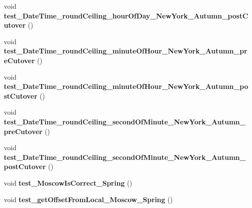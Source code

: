 \begin{DoxyCompactItemize}
\item 
\hypertarget{classorg_1_1joda_1_1time_1_1_test_date_time_zone_cutover_ac9579475951bc638caa91ef9fdf9e3fb}{void {\bfseries test\-\_\-\-Date\-Time\-\_\-round\-Ceiling\-\_\-hour\-Of\-Day\-\_\-\-New\-York\-\_\-\-Autumn\-\_\-post\-Cutover} ()}\label{classorg_1_1joda_1_1time_1_1_test_date_time_zone_cutover_ac9579475951bc638caa91ef9fdf9e3fb}

\item 
\hypertarget{classorg_1_1joda_1_1time_1_1_test_date_time_zone_cutover_afac3819f9777d300502abf8e77659004}{void {\bfseries test\-\_\-\-Date\-Time\-\_\-round\-Ceiling\-\_\-minute\-Of\-Hour\-\_\-\-New\-York\-\_\-\-Autumn\-\_\-pre\-Cutover} ()}\label{classorg_1_1joda_1_1time_1_1_test_date_time_zone_cutover_afac3819f9777d300502abf8e77659004}

\item 
\hypertarget{classorg_1_1joda_1_1time_1_1_test_date_time_zone_cutover_a977a97d5d82bd271da9260978bbe265e}{void {\bfseries test\-\_\-\-Date\-Time\-\_\-round\-Ceiling\-\_\-minute\-Of\-Hour\-\_\-\-New\-York\-\_\-\-Autumn\-\_\-post\-Cutover} ()}\label{classorg_1_1joda_1_1time_1_1_test_date_time_zone_cutover_a977a97d5d82bd271da9260978bbe265e}

\item 
\hypertarget{classorg_1_1joda_1_1time_1_1_test_date_time_zone_cutover_a2ca614029032b4b3bbee62600cf3f96f}{void {\bfseries test\-\_\-\-Date\-Time\-\_\-round\-Ceiling\-\_\-second\-Of\-Minute\-\_\-\-New\-York\-\_\-\-Autumn\-\_\-pre\-Cutover} ()}\label{classorg_1_1joda_1_1time_1_1_test_date_time_zone_cutover_a2ca614029032b4b3bbee62600cf3f96f}

\item 
\hypertarget{classorg_1_1joda_1_1time_1_1_test_date_time_zone_cutover_ab9cdd55757e6d90f6edb5b67ee1428c2}{void {\bfseries test\-\_\-\-Date\-Time\-\_\-round\-Ceiling\-\_\-second\-Of\-Minute\-\_\-\-New\-York\-\_\-\-Autumn\-\_\-post\-Cutover} ()}\label{classorg_1_1joda_1_1time_1_1_test_date_time_zone_cutover_ab9cdd55757e6d90f6edb5b67ee1428c2}

\item 
\hypertarget{classorg_1_1joda_1_1time_1_1_test_date_time_zone_cutover_a867d6ae48a1c411037a16f4257827cf8}{void {\bfseries test\-\_\-\-Moscow\-Is\-Correct\-\_\-\-Spring} ()}\label{classorg_1_1joda_1_1time_1_1_test_date_time_zone_cutover_a867d6ae48a1c411037a16f4257827cf8}

\item 
\hypertarget{classorg_1_1joda_1_1time_1_1_test_date_time_zone_cutover_a8628744e4f1edf21da2d45a12706b77b}{void {\bfseries test\-\_\-get\-Offset\-From\-Local\-\_\-\-Moscow\-\_\-\-Spring} ()}\label{classorg_1_1joda_1_1time_1_1_test_date_time_zone_cutover_a8628744e4f1edf21da2d45a12706b77b}


\end{DoxyCompactItemize}
